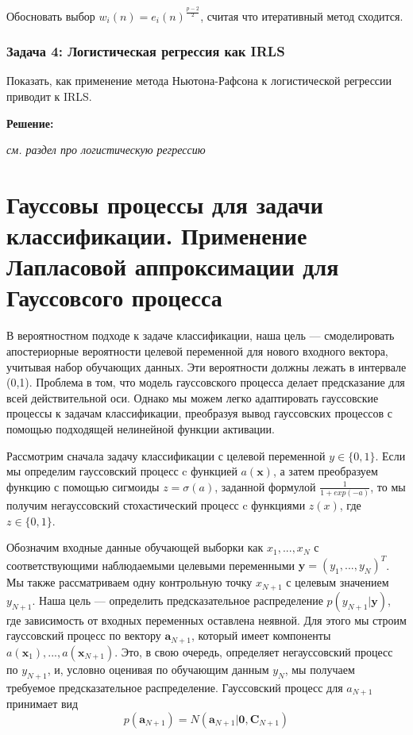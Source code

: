 Обосновать выбор $w_i(n) = e_i(n)^{\frac{p - 2}{2}}$, считая что итеративный метод сходится.

\subsubsection{Задача 4: Логистическая регрессия как IRLS}

Показать, как применение метода Ньютона-Рафсона к логистической регрессии приводит к IRLS.

\textbf{Решение:}

\textit{см. раздел про логистическую регрессию}

\section{Гауссовы процессы для задачи классификации. Применение Лапласовой аппроксимации для Гауссовсого процесса}

В вероятностном подходе к задаче классификации, наша цель — смоделировать апостериорные
вероятности целевой переменной для нового входного вектора, учитывая набор обучающих
данных. Эти вероятности должны лежать в интервале (0,1). Проблема в том, что модель гауссовского процесса делает предсказание для всей действительной оси. Однако мы можем легко
адаптировать гауссовские процессы к задачам классификации, преобразуя вывод
гауссовских процессов с помощью подходящей нелинейной функции активации.

Рассмотрим сначала задачу классификации с целевой переменной $y \in \{0,1\}$. Если мы определим гауссовский процесс c функцией $a(\mathbf{x})$, а затем преобразуем функцию с помощью сигмоиды $z=\sigma(a)$, заданной формулой $\frac{1}{1+exp(-a)}$, то мы получим негауссовский
стохастический процесс c функциями $z(x)$, где $z \in \{0,1\}$.

Обозначим входные данные обучающей выборки как $x_1,...,x_N$ с соответствующими
наблюдаемыми целевыми переменными $\mathbf{y} =(y_1,...,y_N)^T$. Мы также рассматриваем одну контрольную точку
$x_{N+1}$ с целевым значением $y_{N+1}$. Наша цель — определить предсказательное распределение
$p(y_{N+1}|\mathbf{y})$, где зависимость от входных переменных оставлена неявной. Для этого мы строим гауссовский процесс по вектору $\mathbf{a}_{N+1}$, который имеет компоненты $a(\mathbf{x}_1),...,a(\mathbf{x}_{N+1})$. Это, в свою очередь, определяет негауссовский процесс по $y_{N+1}$,
и, условно оценивая по обучающим данным $y_N$, мы получаем требуемое предсказательное распределение. Гауссовский процесс для $a_{N+1}$ принимает вид
\[ p(\mathbf{a}_{N+1})=N(\mathbf{a}_{N+1}|\mathbf{0},\mathbf{C}_{N+1})\]


